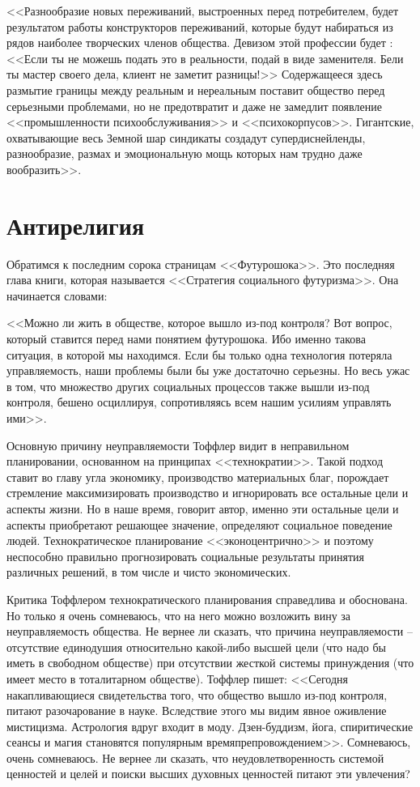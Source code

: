 \documentclass{book}
\begin{document}
<<Разнообразие новых переживаний, выстроенных перед по­требителем, будет результатом работы конструкторов пережи­ваний, которые будут набираться из рядов наиболее творче­ских членов общества. Девизом этой профессии будет : <<Если ты не можешь подать это в реальности, подай в виде заменителя. Бели ты мастер своего дела, клиент не заметит разницы!>> Содер­жащееся здесь размытие границы между реальным и нереаль­ным поставит общество перед серьезными проблемами, но не предотвратит и даже не замедлит появление <<промышленности психообслуживания>> и <<психокорпусов>>. Гигантские, охваты­вающие весь Земной шар синдикаты создадут супердиснейленды, разнообразие, размах и эмоциональную мощь которых нам трудно даже вообразить>>.%


\section{Антирелигия}

Обратимся к последним сорока страницам <<Футурошока>>. Это последняя глава книги, которая называется <<Стратегия со­циального футуризма>>. Она начинается словами:

<<Можно ли жить в обществе, которое вышло из-под конт­роля? Вот вопрос, который ставится перед нами понятием футурошока. Ибо именно такова ситуация, в которой мы находим­ся. Если бы только одна технология потеряла управляемость, наши проблемы были бы уже достаточно серьезны. Но весь ужас в том, что множество других социальных процессов также вышли из-под контроля, бешено осциллируя, сопротивляясь всем нашим усилиям управлять ими>>.%

Основную причину неуправляемости Тоффлер видит в непра­вильном планировании, основанном на принципах <<технократии>>. Такой подход ставит во главу угла экономику, произ­водство материальных благ, порождает стремление максимизи­ровать производство и игнорировать все остальные цели и ас­пекты жизни. Но в наше время, говорит автор, именно эти остальные цели и аспекты приобретают решающее значение, опре­деляют социальное поведение людей. Технократическое плани­рование <<эконоцентрично>> и поэтому неспособно правильно прогнозировать социальные результаты принятия различных ре­шений, в том числе и чисто экономических.

Критика Тоффлером технократического планирования спра­ведлива и обоснована. Но только я очень сомневаюсь, что на не­го можно возложить вину за неуправляемость общества. Не вер­нее ли сказать, что причина неуправляемости -- отсутствие еди­нодушия относительно какой-либо высшей цели (что надо бы иметь в свободном обществе) при отсутствии жесткой систе­мы принуждения (что имеет место в тоталитарном обществе). Тоффлер пишет: <<Сегодня накапливающиеся свидетельства того, что общество вышло из-под контроля, питают разочаро­вание в науке. Вследствие этого мы видим явное оживление мистицизма. Астрология вдруг входит в моду. Дзен-буддизм, йога, спиритические сеансы и магия становятся популярным времяпрепровождением>>.%
Сомневаюсь, очень сомневаюсь. Не вернее ли сказать, что неудовлетворенность системой ценно­стей и целей и поиски высших духовных ценностей питают эти увлечения?
\end{document}
